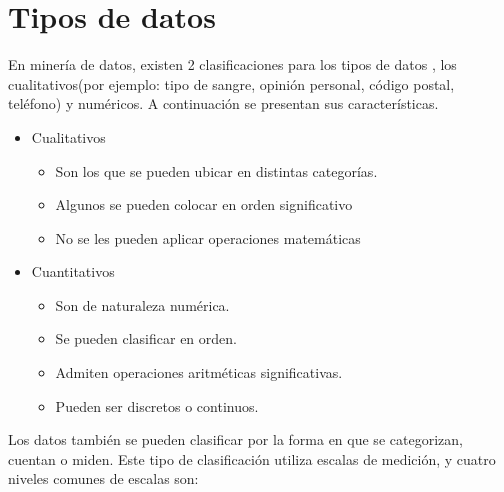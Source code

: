 \section{Tipos de datos}

En miner\'ia de datos, existen 2 clasificaciones para los tipos de datos
 \cite{Yang2010}, los cualitativos(por ejemplo: tipo de sangre, opini\'on 
 personal, c\'odigo postal, tel\'efono) y num\'ericos. A continuaci\'on se 
 presentan sus caracter\'isticas.

\begin{itemize}
\item Cualitativos\cite{Yang2010} 
	\begin{itemize}
	\item Son los que se pueden ubicar en distintas  categor\'ias.
	\item Algunos se pueden colocar en orden significativo
	\item No se les pueden aplicar operaciones matem\'aticas
	\end{itemize}
	 

\item Cuantitativos\cite{Yang2010}
	\begin{itemize}
	\item Son de naturaleza num\'erica. 
	\item Se pueden clasificar en orden. 
	\item Admiten operaciones aritm\'eticas significativas. 
	\item Pueden ser discretos o continuos.		
	\end{itemize}
\end{itemize}

Los datos tambi\'en se pueden clasificar por la forma en que se categorizan, cuentan o miden. Este tipo de clasificaci\'on utiliza escalas de medici\'on, y cuatro niveles comunes de escalas son: 

